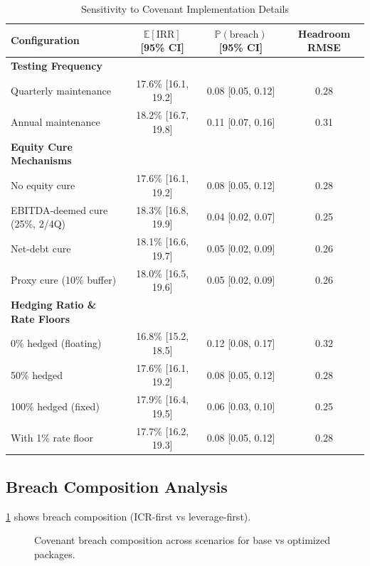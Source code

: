 \documentclass[11pt,a4paper]{article}
\newcommand{\E}{\mathbb{E}}
\newcommand{\Prob}{\mathbb{P}}
\theoremstyle{plain}
\theoremstyle{definition}
\newcommand{\Cref}[1]{\ref{#1}}
\begin{document}
\begin{table}[h]
\centering
\caption{Sensitivity to Covenant Implementation Details}
\begin{tabular}{lccc}
\toprule
Configuration & $\E[\mathrm{IRR}]$ [95\% CI] & $\Prob(\text{breach})$ [95\% CI] & Headroom RMSE \\
\midrule
\textbf{Testing Frequency} & & & \\
Quarterly maintenance & 17.6\% [16.1, 19.2] & 0.08 [0.05, 0.12] & 0.28 \\
Annual maintenance & 18.2\% [16.7, 19.8] & 0.11 [0.07, 0.16] & 0.31 \\
\textbf{Equity Cure Mechanisms} & & & \\
No equity cure & 17.6\% [16.1, 19.2] & 0.08 [0.05, 0.12] & 0.28 \\
EBITDA-deemed cure (25\%, 2/4Q) & 18.3\% [16.8, 19.9] & 0.04 [0.02, 0.07] & 0.25 \\
Net-debt cure & 18.1\% [16.6, 19.7] & 0.05 [0.02, 0.09] & 0.26 \\
Proxy cure (10\% buffer) & 18.0\% [16.5, 19.6] & 0.05 [0.02, 0.09] & 0.26 \\
\textbf{Hedging Ratio \& Rate Floors} & & & \\
0\% hedged (floating) & 16.8\% [15.2, 18.5] & 0.12 [0.08, 0.17] & 0.32 \\
50\% hedged & 17.6\% [16.1, 19.2] & 0.08 [0.05, 0.12] & 0.28 \\
100\% hedged (fixed) & 17.9\% [16.4, 19.5] & 0.06 [0.03, 0.10] & 0.25 \\
With 1\% rate floor & 17.7\% [16.2, 19.3] & 0.08 [0.05, 0.12] & 0.28 \\
\bottomrule
\end{tabular}
\label{tab:sensitivity}
\end{table}

\subsection{Breach Composition Analysis}

\Cref{fig:breach_composition} shows breach composition (ICR-first vs leverage-first).

\begin{figure}[h]
\centering
{}
\caption{Covenant breach composition across scenarios for base vs optimized packages.}
\label{fig:breach_composition}
\end{figure}
\end{document}
